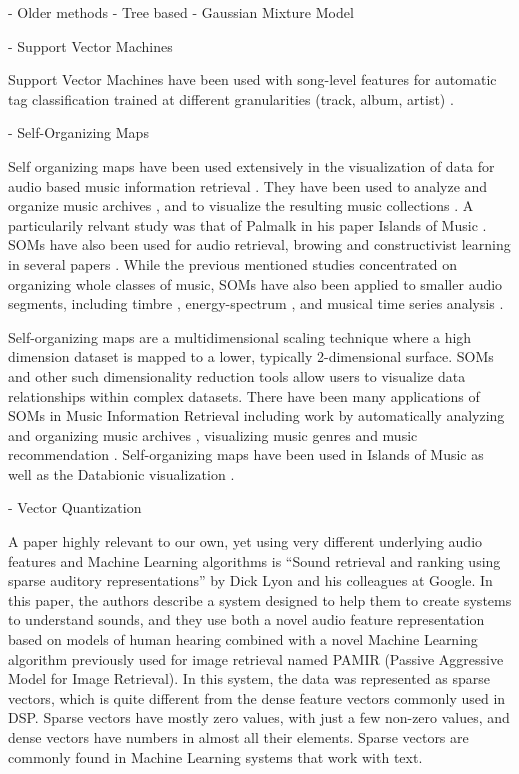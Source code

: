 - Older methods
	- Tree based
	- Gaussian Mixture Model

- Support Vector Machines

Support Vector Machines have been used with song-level features for
automatic tag classification trained at different granularities
(track, album, artist) \cite{mandel-ismir2008}.

- Self-Organizing Maps

Self organizing maps have been used extensively in the visualization
of data for audio based music information retrieval \cite{cooper06}.
They have been used to analyze and organize music archives
\cite{rauber01a} \cite{rauber98a} \cite{rauber98b} \cite{rauber02a},
and to visualize the resulting music collections \cite{rauber03a}
\cite{pampalk04} \cite{rauber02}.  A particularily relvant study was
that of Palmalk in his paper Islands of Music \cite{pampalk03}.  SOMs
have also been used for audio retrieval, browing and constructivist
learning in several papers \cite{cano02} \cite{fruehwirth01}
\cite{honkela00}.  While the previous mentioned studies concentrated
on organizing whole classes of music, SOMs have also been applied to
smaller audio segments, including timbre \cite{toirvainen97},
energy-spectrum \cite{masugi04}, and musical time series analysis
\cite{capinteiro98}.

Self-organizing maps \cite{kohonen95a} are a multidimensional scaling
technique where a high dimension dataset is mapped to a lower,
typically 2-dimensional surface. SOMs and other such dimensionality
reduction tools allow users to visualize data relationships within
complex datasets.  There have been many applications of SOMs in Music
Information Retrieval including work by automatically analyzing and
organizing music archives \cite{rauber01a} \cite{rauber98b},
visualizing music genres \cite{pampalk03}\cite{pampalk03} and music
recommendation \cite{vembu05a}.  Self-organizing maps have been used
in Islands of Music \cite{RPM02} as well as the Databionic
visualization \cite{MUN05}.

- Vector Quantization

A paper highly relevant to our own, yet using very different
underlying audio features and Machine Learning algorithms is ``Sound
retrieval and ranking using sparse auditory representations''
\cite{lyon10} by Dick Lyon and his colleagues at Google.  In this
paper, the authors describe a system designed to help them to create
systems to understand sounds, and they use both a novel audio feature
representation based on models of human hearing combined with a novel
Machine Learning algorithm previously used for image retrieval named
PAMIR (Passive Aggressive Model for Image Retrieval).  In this system,
the data was represented as sparse vectors, which is quite different
from the dense feature vectors commonly used in DSP.  Sparse vectors
have mostly zero values, with just a few non-zero values, and dense
vectors have numbers in almost all their elements.  Sparse vectors are
commonly found in Machine Learning systems that work with text.

